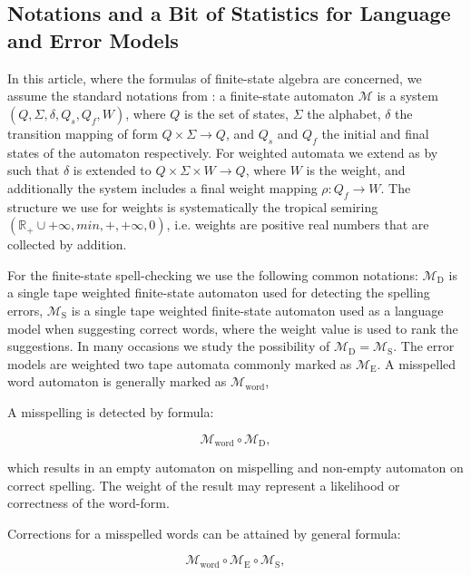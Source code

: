 \documentclass[a4paper,12pt]{article}
\begin{document}
\subsection{Notations and a Bit of Statistics for Language and Error Models}
\label{subsec:theory}

In this article, where the formulas of finite-state algebra are concerned, we
assume the standard notations from \cite{aho2007compilers}: a
finite-state automaton $\mathcal{M}$ is a system $(Q, \Sigma, \delta, Q_s, Q_f,
W)$, where $Q$ is the set of states, $\Sigma$ the alphabet, $\delta$ the
transition mapping of form $Q \times \Sigma \rightarrow Q$, and $Q_s$ and $Q_f$
the initial and final states of the automaton respectively.  For weighted
automata we extend as by \cite{mohri2009weighted} such that $\delta$ is
extended to $Q \times \Sigma \times W \rightarrow Q$, where $W$ is the
weight, and additionally the system includes a final weight mapping $\rho: Q_f
\rightarrow W$. The structure we use for weights is systematically the tropical
semiring $(\mathbb{R}_+ \cup {+\infty}, min, +, +\infty, 0)$, i.e. weights are
positive real numbers that are collected by addition.

For the finite-state spell-checking we use the following common notations:
$\mathcal{M}_\mathrm{D}$ is a single tape weighted finite-state automaton used
for detecting the spelling errors, $\mathcal{M}_\mathrm{S}$ is a single tape
weighted finite-state automaton used as a language model when suggesting
correct words, where the weight value is used to rank the suggestions.  In many
occasions we study the possibility of $\mathcal{M}_\mathrm{D} =
\mathcal{M}_\mathrm{S}$. The error models are weighted two tape automata
commonly marked as $\mathcal{M}_\mathrm{E}$. A misspelled word automaton is
generally marked as $\mathcal{M}_\mathrm{word}$,

A misspelling is detected by formula:

\begin{equation}
    \label{formula:detection}
    \mathcal{M}_{\mathrm{word}} \circ \mathcal{M}_\mathrm{D},
\end{equation}

which results in an empty automaton on mispelling and non-empty automaton on
correct spelling. The weight of the result may represent a likelihood or
correctness of the word-form.

Corrections for a misspelled words can be attained by general formula:

\begin{equation}
    \label{formula:correction}
    \mathcal{M}_{\mathrm{word}} \circ \mathcal{M}_{\mathrm{E}} \circ \mathcal{M}_{\mathrm{S}},
\end{equation}
\end{document}
